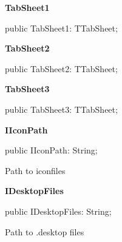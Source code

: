 \documentclass{report}
\newif\ifpdf
\begin{document}
\begin{list}{}
\par  \label{dgunit.TDGForm-TabSheet1}
\item[\textbf{TabSheet1}\hfill]
\ifpdf
\begin{flushleft}
\fi
\begin{ttfamily}
public TabSheet1: TTabSheet;\end{ttfamily}

\ifpdf
\end{flushleft}
\fi


\par  \label{dgunit.TDGForm-TabSheet2}
\item[\textbf{TabSheet2}\hfill]
\ifpdf
\begin{flushleft}
\fi
\begin{ttfamily}
public TabSheet2: TTabSheet;\end{ttfamily}

\ifpdf
\end{flushleft}
\fi


\par  \label{dgunit.TDGForm-TabSheet3}
\item[\textbf{TabSheet3}\hfill]
\ifpdf
\begin{flushleft}
\fi
\begin{ttfamily}
public TabSheet3: TTabSheet;\end{ttfamily}

\ifpdf
\end{flushleft}
\fi


\par  \label{dgunit.TDGForm-IIconPath}
\item[\textbf{IIconPath}\hfill]
\ifpdf
\begin{flushleft}
\fi
\begin{ttfamily}
public IIconPath: String;\end{ttfamily}

\ifpdf
\end{flushleft}
\fi


\par Path to iconfiles\label{dgunit.TDGForm-IDesktopFiles}
\item[\textbf{IDesktopFiles}\hfill]
\ifpdf
\begin{flushleft}
\fi
\begin{ttfamily}
public IDesktopFiles: String;\end{ttfamily}

\ifpdf
\end{flushleft}
\fi


\par Path to .desktop files\end{list}
\end{document}
